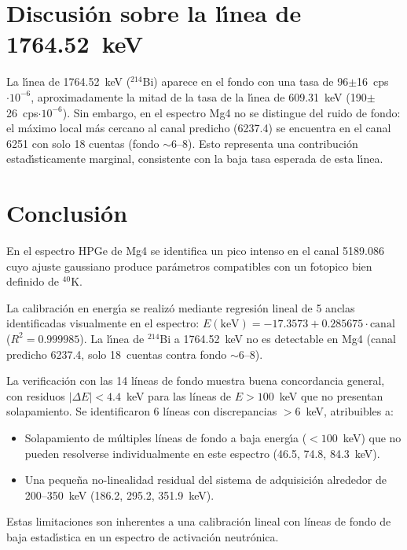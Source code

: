 \documentclass[12pt,a4paper]{article}
\begin{document}
\section*{Discusi\'on sobre la l\'{\i}nea de 1764.52~keV}
La l\'{\i}nea de 1764.52~keV ($^{214}$Bi) aparece en el fondo con una tasa de
96$\pm$16~cps$\cdot10^{-6}$, aproximadamente la mitad de la tasa de la
l\'{\i}nea de 609.31~keV (190$\pm$26~cps$\cdot10^{-6}$).
Sin embargo, en el espectro Mg4 no se distingue del ruido de fondo: el
m\'aximo local m\'as cercano al canal predicho (6237.4) se encuentra en el
canal 6251 con solo 18 cuentas (fondo $\sim$6--8).
Esto representa una contribuci\'on estad\'{\i}sticamente marginal,
consistente con la baja tasa esperada de esta l\'{\i}nea.

\section*{Conclusi\'on}
En el espectro HPGe de Mg4 se identifica un pico intenso en el canal
5189.086 cuyo ajuste gaussiano produce par\'ametros compatibles con un
fotopico bien definido de $^{40}$K.

La calibraci\'on en energ\'{\i}a se realiz\'o mediante regresi\'on lineal
de 5 anclas identificadas visualmente en el espectro:
$E(\text{keV}) = -17.3573 + 0.285675\cdot\text{canal}$
($R^2 = 0.999985$).
La l\'{\i}nea de $^{214}$Bi a 1764.52~keV no es detectable en Mg4
(canal predicho 6237.4, solo 18~cuentas contra fondo $\sim$6--8).

La verificaci\'on con las 14 l\'ineas de fondo muestra buena concordancia
general, con residuos $|\Delta E| < 4.4$~keV para las l\'ineas de
$E > 100$~keV que no presentan solapamiento. Se identificaron 6 l\'ineas con
discrepancias $>6$~keV, atribuibles a:
\begin{itemize}
  \item Solapamiento de m\'ultiples l\'ineas de fondo a baja energ\'{\i}a
    ($<100$~keV) que no pueden resolverse individualmente en este espectro
    (46.5, 74.8, 84.3~keV).
  \item Una peque\~na no-linealidad residual del sistema de adquisici\'on
    alrededor de 200--350~keV (186.2, 295.2, 351.9~keV).
\end{itemize}
Estas limitaciones son inherentes a una calibraci\'on lineal con l\'ineas de
fondo de baja estad\'{\i}stica en un espectro de activaci\'on neutr\'onica.
\end{document}
